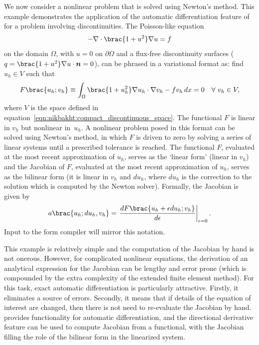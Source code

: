 We now consider a nonlinear problem that is solved using Newton's
method.  This example demonstrates the application of the automatic
differentiation feature of \ufl{} for a problem involving discontinuities.
The Poisson-like equation
%
\begin{equation}
  -\nabla \cdot \brac{1 + u^{2}} \nabla u = f
\end{equation}
%
on the domain $\Omega$, with $u = 0$ on $\partial \Omega$ and a flux-free
discontinuity surfaces ($q = \brac{1 + u^{2}} \nabla u \cdot \vect{n}
= 0$), can be phrased in a variational format as: find $u_{h} \in V$
such that
%
\begin{equation}
  F\brac{u_{h}; v_{h}}
    \equiv \int_{\Omega} \brac{1 + u_{h}^{2}} \nabla u_{h} \cdot \nabla v_{h} - f v_{h}  \dif x
    = 0 \quad \forall \ v_{h} \in V,
\label{eqn:nikbakht:nonlinear_poisson}
\end{equation}
%
where $V$ is the space defined in
equation~\eqref{eqn:nikbakht:compact_discontinuous_space}.
The functional
$F$ is linear in $v_{h}$ but nonlinear in~$u_{h}$.  A nonlinear problem
posed in this format can be solved using Newton's method, in which $F$ is
driven to zero by solving a series of linear systems until a prescribed
tolerance is reached. The functional $F$, evaluated at the most recent
approximation of $u_{h}$, serves as the `linear form' (linear in $v_{h}$)
and the Jacobian of $F$, evaluated at the most recent approximation
of $u_{h}$, serves as the bilinear form (it is linear in $v_{h}$ and
$du_{h}$, where $du_{h}$ is the correction to the solution which is
computed by the Newton solver). Formally, the Jacobian is given by
%
\begin{equation}
  a\brac{u_{h}; du_{h}, v_{h}} = \left. \frac{dF\brac{u_{h}
      + \epsilon du_{h}; v_{h}}}{d \epsilon} \right|_{\epsilon=0}.
\label{eqn:nikbakht:nonlinear_poisson_J}
\end{equation}
%
Input to the form compiler will mirror this notation.

This example is relatively simple and the computation of the Jacobian
by hand is not onerous. However, for complicated nonlinear equations,
the derivation of an analytical expression for the Jacobian can be
lengthy and error prone (which is compounded by the extra complexity of
the extended finite element method).  For this task, exact automatic
differentiation is particularly attractive. Firstly, it eliminates a
source of errors.  Secondly, it means that if details of the equation of
interest are changed, then there is not need to re-evaluate the Jacobian
by hand. \ufl{} provides functionality for automatic differentiation,
and the directional derivative feature can be used to compute Jacobian
from a functional, with the Jacobian filling the role of the bilinear
form in the linearized system.


